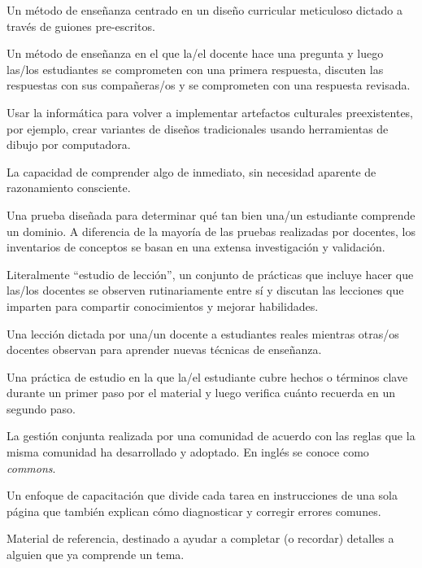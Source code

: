 \begin{description}
 Un método de enseñanza centrado
en un diseño curricular meticuloso dictado a través de guiones pre-escritos.

 Un método de enseñanza en el que la/el docente hace una pregunta y 
luego las/los estudiantes se comprometen con una primera respuesta, discuten las respuestas con sus compañeras/os y 
se comprometen con una respuesta revisada.

 Usar la informática
para volver a implementar artefactos culturales preexistentes, por ejemplo,
crear variantes de diseños tradicionales usando herramientas de dibujo por computadora.

 La capacidad de comprender algo de inmediato,
sin necesidad aparente de razonamiento consciente.

 Una prueba diseñada para determinar
qué tan bien una/un estudiante comprende un dominio. A diferencia de la mayoría de las pruebas realizadas por docentes,
los inventarios de conceptos se basan en una extensa investigación y validación.

 Literalmente ``estudio de lección'', un conjunto de prácticas que incluye hacer que 
las/los docentes se observen rutinariamente entre sí y discutan las lecciones que imparten para compartir conocimientos y 
mejorar habilidades.

 Una lección dictada por una/un docente a estudiantes reales
mientras otras/os docentes observan para aprender nuevas técnicas de enseñanza.

 Una práctica de estudio
en la que la/el estudiante cubre hechos o términos clave durante un primer paso por el material y 
luego verifica cuánto recuerda en un segundo paso.

 La gestión 
conjunta realizada por una comunidad
de acuerdo con las reglas que la misma comunidad ha desarrollado y adoptado. En inglés se conoce como \emph{commons}.

 Un enfoque de capacitación que divide
cada tarea en instrucciones de una sola página que también
explican cómo diagnosticar y corregir errores comunes.

 Material de referencia, destinado a ayudar a completar (o recordar) detalles a alguien que ya comprende un tema.


\end{description}
